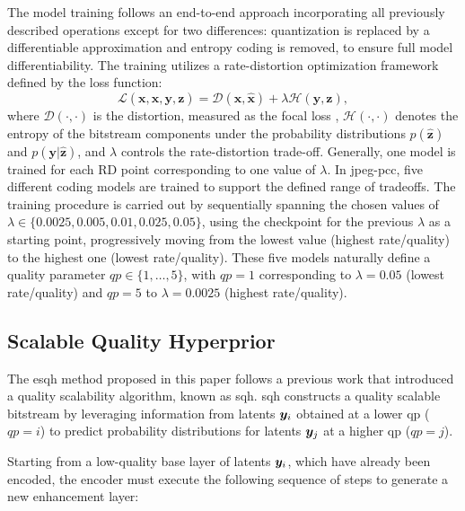 The model training follows an end-to-end approach incorporating all previously described operations except for two differences: quantization is replaced by a differentiable approximation and entropy coding is removed, to ensure full model differentiability. The training utilizes a rate-distortion optimization framework defined by the loss function:
\begin{equation}
    \mathcal{L}(\bm{x}, \hat{\bm{x}}, \bm{y}, \bm{z}) = \mathcal{D}(\bm{x}, \hat{\bm{x}}) + \lambda\mathcal{H}(\bm{y}, \bm{z}),
\end{equation}
where $\mathcal{D}(\cdot, \cdot)$ is the distortion, measured as the focal loss \cite{lin2017focal}, $\mathcal{H}(\cdot, \cdot)$ denotes the entropy of the bitstream components under the probability distributions $p(\hat{\bm{z}})$ and $p(\bm{y}|\hat{\bm{z}})$, and $\lambda$ controls the rate-distortion trade-off.
Generally, one model is trained for each RD point corresponding to one value of $\lambda$. In \gls{jpeg-pcc}, five different coding models are trained to support the defined range of tradeoffs.
The training procedure is carried out by sequentially spanning the chosen values of $\lambda \in \{0.0025, 0.005, 0.01, 0.025, 0.05\}$, using the checkpoint for the previous $\lambda$ as a starting point, progressively moving from the lowest value (highest rate/quality) to the highest one (lowest rate/quality). These five models naturally define a quality parameter $qp \in \{1, \dots , 5\}$, with $qp = 1$ corresponding to $\lambda = 0.05$ (lowest rate/quality) and $qp = 5$ to $\lambda = 0.0025$ (highest rate/quality).

\subsection{Scalable Quality Hyperprior}

The \gls{esqh} method proposed in this paper follows a previous work \cite{mari2024point} that introduced a quality scalability algorithm, known as \gls{sqh}. \gls{sqh} constructs a quality scalable bitstream by leveraging information from latents $\y_i$ obtained at a lower \gls{qp} ($qp=i$) to predict probability distributions for latents $\y_j$ at a higher \gls{qp} ($qp=j$).

Starting from a low-quality base layer of latents $\y_i$, which have already been encoded, the encoder must execute the following sequence of steps to generate a new enhancement layer:

